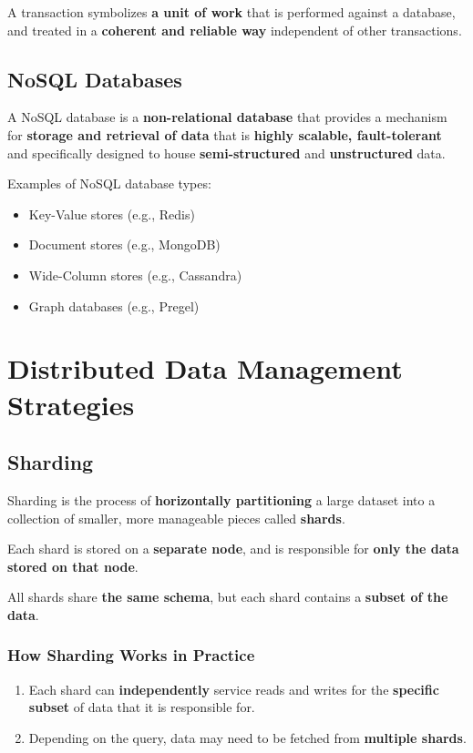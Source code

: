 \documentclass[12pt,a4paper]{report}
\begin{document}
A transaction symbolizes \textbf{a unit of work} that is performed against a database, and treated in a \textbf{coherent and reliable way} independent of other transactions.

\subsection{NoSQL Databases}
A NoSQL database is a \textbf{non-relational database} that provides a mechanism for \textbf{storage and retrieval of data} that is \textbf{highly scalable, fault-tolerant} and specifically designed to house \textbf{semi-structured} and \textbf{unstructured} data.

\begin{mdframed}
Examples of NoSQL database types:
\begin{itemize}
  \item Key-Value stores (e.g., Redis)
  \item Document stores (e.g., MongoDB)
  \item Wide-Column stores (e.g., Cassandra)
  \item Graph databases (e.g., Pregel)
\end{itemize}
\end{mdframed}

\section{Distributed Data Management Strategies}

\subsection{Sharding}
Sharding is the process of \textbf{horizontally partitioning} a large dataset into a collection of smaller, more manageable pieces called \textbf{shards}.

Each shard is stored on a \textbf{separate node}, and is responsible for \textbf{only the data stored on that node}.

All shards share \textbf{the same schema}, but each shard contains a \textbf{subset of the data}.

\subsubsection{How Sharding Works in Practice}
\begin{enumerate}
  \item Each shard can \textbf{independently} service reads and writes for the \textbf{specific subset} of data that it is responsible for.
  \item Depending on the query, data may need to be fetched from \textbf{multiple shards}.
\end{enumerate}
\end{document}
